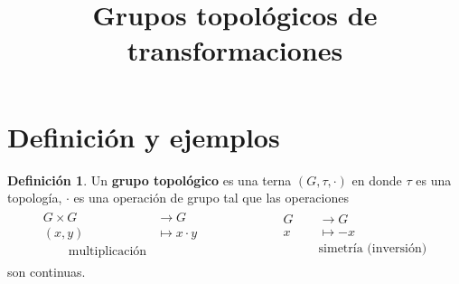 \documentclass[spanish]{article}
\title{Grupos topológicos de transformaciones}
\renewcommand{\contentsname}{Índice}
\theoremstyle{definition}
\newtheorem*{defn}{Definición}
\begin{document}
	\maketitle
	\tableofcontents
	
\section{Definición y ejemplos}
\begin{defn}
	Un \textbf{grupo topológico} es una terna $(G,\tau,\cdot)$ en donde $\tau$ es una topología, $\cdot$ es una operación de grupo tal que las operaciones
	\begin{align*}
		\begin{aligned}
		G\times G&\to G\\
		(x,y)&\mapsto x\cdot y\\
		\qquad\text{multiplicación}
		\end{aligned}
		\qquad\qquad\qquad
		\begin{aligned}
		G&\to G\\
		x&\mapsto -x\\
		\qquad&\text{simetría (inversión)}
		\end{aligned}
	\end{align*}
	son continuas.
\end{defn}
\end{document}
